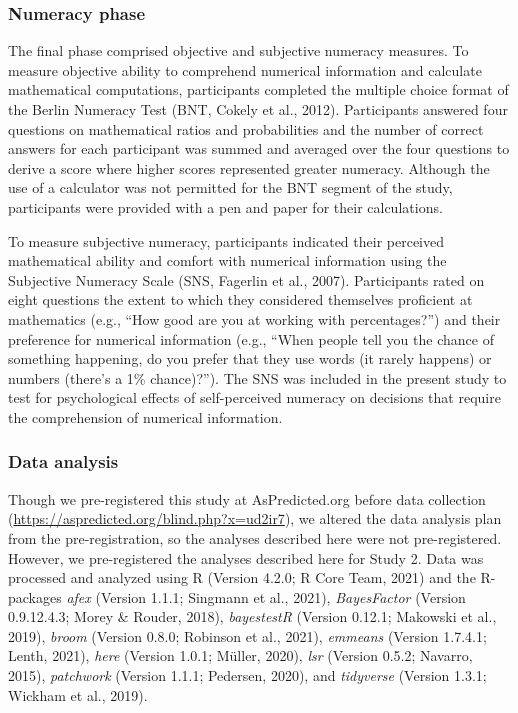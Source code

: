 \documentclass[
  pub,floatsintext]{apa6}
\begin{document}
\hypertarget{numeracy-phase}{%
\subsubsection{Numeracy phase}\label{numeracy-phase}}

The final phase comprised objective and subjective numeracy measures. To measure objective ability to comprehend numerical information and calculate mathematical computations, participants completed the multiple choice format of the Berlin Numeracy Test (BNT, Cokely et al., 2012). Participants answered four questions on mathematical ratios and probabilities and the number of correct answers for each participant was summed and averaged over the four questions to derive a score where higher scores represented greater numeracy. Although the use of a calculator was not permitted for the BNT segment of the study, participants were provided with a pen and paper for their calculations.

To measure subjective numeracy, participants indicated their perceived mathematical ability and comfort with numerical information using the Subjective Numeracy Scale (SNS, Fagerlin et al., 2007). Participants rated on eight questions the extent to which they considered themselves proficient at mathematics (e.g., ``How good are you at working with percentages?'') and their preference for numerical information (e.g., ``When people tell you the chance of something happening, do you prefer that they use words (it rarely happens) or numbers (there's a 1\% chance)?''). The SNS was included in the present study to test for psychological effects of self-perceived numeracy on decisions that require the comprehension of numerical information.

\hypertarget{data-analysis}{%
\subsubsection{Data analysis}\label{data-analysis}}

Though we pre-registered this study at AsPredicted.org before data collection (\url{https://aspredicted.org/blind.php?x=ud2ir7}), we altered the data analysis plan from the pre-registration, so the analyses described here were not pre-registered. However, we pre-registered the analyses described here for Study 2. Data was processed and analyzed using R (Version 4.2.0; R Core Team, 2021) and the R-packages \emph{afex} (Version 1.1.1; Singmann et al., 2021), \emph{BayesFactor} (Version 0.9.12.4.3; Morey \& Rouder, 2018), \emph{bayestestR} (Version 0.12.1; Makowski et al., 2019), \emph{broom} (Version 0.8.0; Robinson et al., 2021), \emph{emmeans} (Version 1.7.4.1; Lenth, 2021), \emph{here} (Version 1.0.1; Müller, 2020), \emph{lsr} (Version 0.5.2; Navarro, 2015), \emph{patchwork} (Version 1.1.1; Pedersen, 2020), and \emph{tidyverse} (Version 1.3.1; Wickham et al., 2019).
\end{document}
